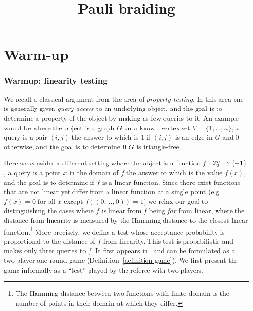 



\part{Warm-up}
\label{book-part-warmup}

\title{Pauli braiding}
\label{chapter-paulibraiding}

\maketitle

\label{section-phantom}

\tableofcontents

\section{Warmup: linearity testing}

We recall a classical argument from the area of \emph{property testing}. In this area one is generally given \emph{query access} to an underlying object, and the goal is to determine a property of the object by making as few queries to it. An example would be where the object is a graph $G$ on a known vertex set $V = \{1,\ldots, n\}$, a query is a pair $(i,j)$ the answer to which is $1$ if $(i,j)$ is an edge in $G$ and $0$ otherwise, and the goal is to determine if $G$ is triangle-free. 

Here we consider a different setting where the object is a function $f:\mathbb{Z}_2^n\to\{\pm1 \}$, a query is a point $x$ in the domain of $f$ the answer to which is the value $f(x)$, and the goal is to determine if $f$ is a linear function. Since there exist functions that are not linear yet differ from a linear function at a single point (e.g.\ $f(x)=0$ for all $x$ except $f((0,\ldots,0))=1$) we relax our goal to distinguishing the cases where $f$ is linear from $f$ being \emph{far} from linear, where the distance from linearity is measured by the Hamming distance to the closest linear function.\footnote{The Hamming distance between two functions with finite domain is the number of points in their domain at which they differ.} More precisely, we define a test whose acceptance probability is proportional to the distance of $f$ from linearity. This test is probabilistic and makes only three queries to $f$. It first appears in~\cite{blum1993self} and can be formulated as a two-player one-round game (Definition~\ref{definition-game}). We first present the game informally as a ``test'' played by the referee with two players.  


